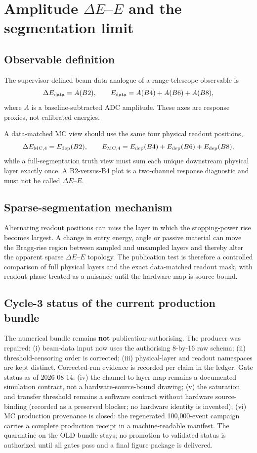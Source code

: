 \section{Amplitude \texorpdfstring{$\Delta E$--$E$}{Delta E--E} and the segmentation limit}

\subsection{Observable definition}

The supervisor-defined beam-data analogue of a range-telescope observable is
\[
\Delta E_{\rm data}=A(B2),\qquad
E_{\rm data}=A(B4)+A(B6)+A(B8),
\]
where \(A\) is a baseline-subtracted ADC amplitude. These axes are response proxies, not calibrated energies.

A data-matched MC view should use the same four physical readout positions,
\[
\Delta E_{\rm MC,4}=E_{\rm dep}(B2),\qquad
E_{\rm MC,4}=E_{\rm dep}(B4)+E_{\rm dep}(B6)+E_{\rm dep}(B8),
\]
while a full-segmentation truth view must sum each unique downstream physical layer exactly once. A B2-versus-B4 plot is a two-channel response diagnostic and must not be called \(\Delta E\)--\(E\).

\subsection{Sparse-segmentation mechanism}

Alternating readout positions can miss the layer in which the stopping-power rise becomes largest. A change in entry energy, angle or passive material can move the Bragg-rise region between sampled and unsampled layers and thereby alter the apparent sparse \(\Delta E\)--\(E\) topology. The publication test is therefore a controlled comparison of full physical layers and the exact data-matched readout mask, with readout phase treated as a nuisance until the hardware map is source-bound.

\subsection{Cycle-3 status of the current production bundle}

\begin{publicationhold}
The numerical bundle remains \textbf{not} publication-authorising. The producer was repaired: (i) beam-data input now uses the authorising 8-by-16 raw schema; (ii) threshold-censoring order is corrected; (iii) physical-layer and readout namespaces are kept distinct. Corrected-run evidence is recorded per claim in the ledger. Gate status as of 2026-08-14: (iv) the channel-to-layer map remains a documented simulation contract, not a hardware-source-bound drawing; (v) the saturation and transfer threshold remains a software contract without hardware source-binding (recorded as a preserved blocker; no hardware identity is invented); (vi) MC production provenance is closed: the regenerated 100{,}000-event campaign carries a complete production receipt in a machine-readable manifest. The quarantine on the OLD bundle stays; no promotion to validated status is authorized until all gates pass and a final figure package is delivered.
\end{publicationhold}

